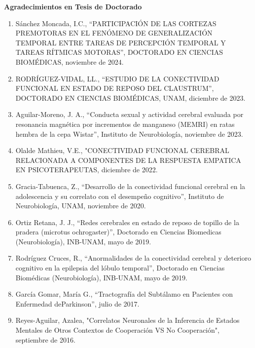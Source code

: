 \textbf{Agradecimientos en Tesis de Doctorado}

\hfill

\begin{enumerate}

\item Sánchez Moncada, I.C., “PARTICIPACIÓN DE LAS CORTEZAS PREMOTORAS EN EL FENÓMENO DE GENERALIZACIÓN TEMPORAL ENTRE 
TAREAS 
DE PERCEPCIÓN TEMPORAL Y TAREAS RÍTMICAS MOTORAS”, DOCTORADO EN CIENCIAS BIOMÉDICAS, noviembre de 2024.

\item RODRÍGUEZ-VIDAL, LL., “ESTUDIO DE LA CONECTIVIDAD FUNCIONAL EN ESTADO DE REPOSO DEL CLAUSTRUM”, DOCTORADO EN CIENCIAS 
BIOMÉDICAS, UNAM, diciembre de 2023.

\item Aguilar-Moreno, J. A., “Conducta sexual y actividad cerebral evaluada por resonancia magnética por incrementos de 
manganeso (MEMRI) en ratas hembra de la cepa Wistar”, Instituto de Neurobiología, noviembre de 2023.

\item Olalde Mathieu, V.E., "CONECTIVIDAD FUNCIONAL CEREBRAL RELACIONADA A COMPONENTES DE LA RESPUESTA EMPATICA EN 
PSICOTERAPEUTAS, diciembre de 2022.

\item Gracia-Tabuenca, Z., “Desarrollo de la conectividad funcional cerebral en la adolescencia y su correlato 
con el desempeño cognitivo”, Instituto de Neurobiología, UNAM, noviembre de 2020.

\item Ortiz Retana, J. J., “Redes cerebrales en estado de reposo de topillo de la pradera (microtus ochrogaster)”, 
Doctorado 
en Ciencias Biomedicas (Neurobiología), INB-UNAM, mayo de 2019.

\item Rodríguez Cruces, R., “Anormalidades de la conectividad cerebral y deterioro cognitivo en la epilepsia del lóbulo 
temporal”, Doctorado en Ciencias Biomédicas (Neurobiología), INB-UNAM, mayo de 2019.

\item García Gomar, María G., “Tractografía del Subtálamo en Pacientes con Enfermedad deParkinson”, julio de 2017.

\item Reyes-Aguilar, Azalea, "Correlatos Neuronales de la Inferencia de Estados Mentales de Otros Contextos de Cooperación 
VS 
No Cooperación", septiembre de 2016.


\end{enumerate}
